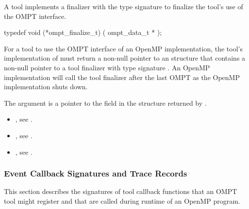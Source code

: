 \label{sec:ompt_finalize_t}

\summary
A tool implements a finalizer with the type signature
 to finalize the tool's use of
the OMPT interface.

\format

\begin{ccppspecific}
\begin{omptInquiry}
typedef void (*ompt_finalize_t) (
  ompt_data_t *
);
\end{omptInquiry}
\end{ccppspecific}


\descr
For a tool to use the OMPT interface of an OpenMP implementation,
the tool's implementation of  must return a
non-null pointer to an
 structure that contains a
non-null pointer to a tool finalizer with
type signature .
An OpenMP implementation will call the tool finalizer
after the last OMPT  as the OpenMP implementation shuts down.

\argdesc
The argument  is a pointer to the
 field in the 
structure returned by .

\crossreferences
\begin{itemize}
\item {}, see
  .
\item {}, see .
\item {}, see .
\end{itemize}


\subsubsection{Event Callback Signatures and Trace Records}
\label{sec:ToolsSupport_callback_signatures}

This section describes the signatures of tool callback functions that an OMPT
tool might register and that are called during runtime of an OpenMP program.

\label{sec:ompt_callback_thread_begin_t}
\format

